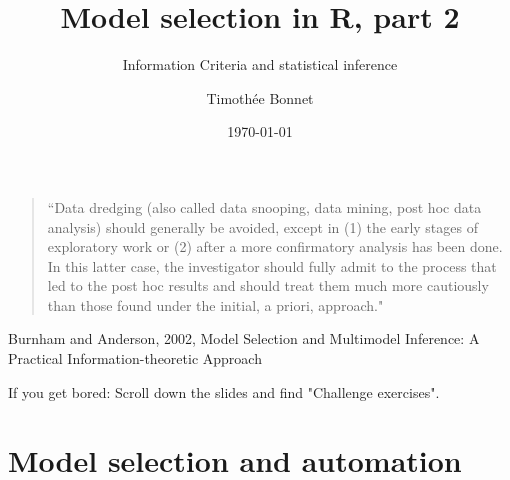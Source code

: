 \documentclass[12pt]{beamer}\usepackage[]{graphicx}\usepackage[]{color}
\title{Model selection in R, part 2}
\subtitle{Information Criteria and statistical inference}
\author{Timoth\'ee Bonnet}
\institute{BDSI / RSB}
\date{\today}
\begin{document}
\begin{frame}
  \begin{quote}
  ``Data dredging (also called data snooping, data mining, post hoc data analysis)
should generally be avoided, except in (1) the early stages of exploratory work
or (2) after a more confirmatory analysis has been done. In this latter case,
the investigator should fully admit to the process that led to the post hoc
results and should treat them much more cautiously than those found under
the initial, a priori, approach."
  \end{quote}

Burnham and Anderson, 2002, Model Selection and Multimodel Inference: A Practical Information-theoretic Approach

\end{frame}

\begin{frame}
\maketitle
\end{frame}



\begin{frame}[standout]{If you get bored:}
Scroll down the slides and find "Challenge exercises".
\end{frame}


\section{Model selection and automation}
\end{document}

